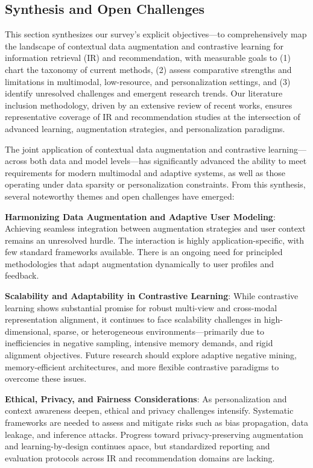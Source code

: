 \documentclass[sigconf]{acmart}
\begin{document}
\subsection{Synthesis and Open Challenges}

This section synthesizes our survey’s explicit objectives---to comprehensively map the landscape of contextual data augmentation and contrastive learning for information retrieval (IR) and recommendation, with measurable goals to (1) chart the taxonomy of current methods, (2) assess comparative strengths and limitations in multimodal, low-resource, and personalization settings, and (3) identify unresolved challenges and emergent research trends. Our literature inclusion methodology, driven by an extensive review of recent works, ensures representative coverage of IR and recommendation studies at the intersection of advanced learning, augmentation strategies, and personalization paradigms.

The joint application of contextual data augmentation and contrastive learning---across both data and model levels---has significantly advanced the ability to meet requirements for modern multimodal and adaptive systems, as well as those operating under data sparsity or personalization constraints. From this synthesis, several noteworthy themes and open challenges have emerged:

\textbf{Harmonizing Data Augmentation and Adaptive User Modeling}: Achieving seamless integration between augmentation strategies and user context remains an unresolved hurdle. The interaction is highly application-specific, with few standard frameworks available. There is an ongoing need for principled methodologies that adapt augmentation dynamically to user profiles and feedback.

\textbf{Scalability and Adaptability in Contrastive Learning}: While contrastive learning shows substantial promise for robust multi-view and cross-modal representation alignment, it continues to face scalability challenges in high-dimensional, sparse, or heterogeneous environments---primarily due to inefficiencies in negative sampling, intensive memory demands, and rigid alignment objectives. Future research should explore adaptive negative mining, memory-efficient architectures, and more flexible contrastive paradigms to overcome these issues.

\textbf{Ethical, Privacy, and Fairness Considerations}: As personalization and context awareness deepen, ethical and privacy challenges intensify. Systematic frameworks are needed to assess and mitigate risks such as bias propagation, data leakage, and inference attacks. Progress toward privacy-preserving augmentation and learning-by-design continues apace, but standardized reporting and evaluation protocols across IR and recommendation domains are lacking.
\end{document}
